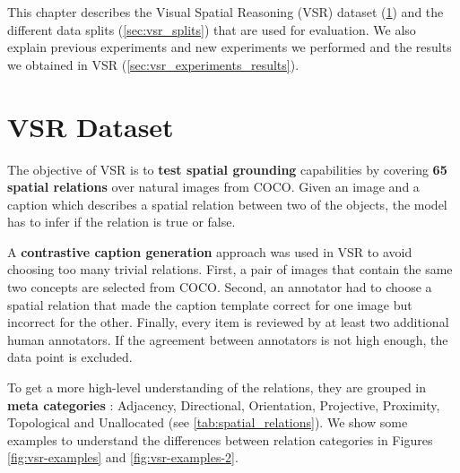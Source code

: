 This chapter describes the Visual Spatial Reasoning (VSR) \cite{liu2022visual} dataset (\cref{sec:vsr_dataset}) and the different data splits (\cref{sec:vsr_splits}) that are used for evaluation. We also explain previous experiments and new experiments we performed and the results we obtained in VSR (\cref{sec:vsr_experiments_results}).

\section{VSR Dataset} \label{sec:vsr_dataset}

The objective of VSR is to \textbf{test spatial grounding} capabilities by covering \textbf{65 spatial relations} over natural images from COCO. Given an image and a caption which describes a spatial relation between two of the objects, the model has to infer if the relation is true or false.

A \textbf{contrastive caption generation} approach was used in VSR to avoid choosing too many trivial relations. First, a pair of images that contain the same two concepts are selected from COCO. Second, an annotator had to choose a spatial relation that made the caption template correct for one image but incorrect for the other. Finally, every item is reviewed by at least two additional human annotators. If the agreement between annotators is not high enough, the data point is excluded.

To get a more high-level understanding of the relations, they are grouped in \textbf{meta categories} \cite{marchi2021cross}: Adjacency, Directional, Orientation, Projective, Proximity, Topological and Unallocated (see \cref{tab:spatial_relations}). We show some examples to understand the differences between relation categories in Figures \ref{fig:vsr-examples} and \ref{fig:vsr-examples-2}.

